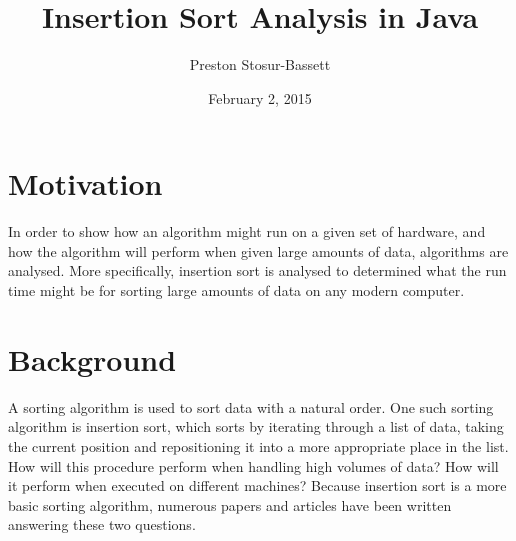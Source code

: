 \documentclass[onecolumn, 12pt, article]{IEEEtran}
\numberwithin{case}{problem}
\numberwithin{condition}{problem}
\numberwithin{condition}{subsection}
\numberwithin{definition}{section}
\theoremstyle{remark}
\numberwithin{question}{problem}
\theoremstyle{plain}
\numberwithin{answer}{problem}
\numberwithin{solution}{section}
\numberwithin{equation}{section}%
\begin{document}
\title{Insertion Sort Analysis in Java}
\author{Preston Stosur-Bassett}
\date{February 2, 2015}
\maketitle

\pagestyle{fancy}

\begin{abstract}
\end{abstract}

\section{Motivation}
In order to show how an algorithm might run on a given set of hardware, and how the algorithm will perform when given large amounts of data, algorithms are analysed. More specifically, insertion sort is analysed to determined what the run time might be for sorting large amounts of data on any modern computer.

\section{Background}
A sorting algorithm is used to sort data with a natural order. One such sorting algorithm is insertion sort, which sorts by iterating through a list of data, taking the current position and repositioning it into a more appropriate place in the list. How will this procedure perform when handling high volumes of data? How will it perform when executed on different machines? Because insertion sort is a more basic sorting algorithm, numerous papers and articles have been written answering these two questions.

\end{document}
